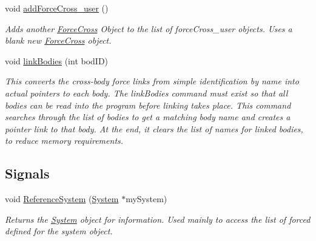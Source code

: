 \begin{DoxyCompactItemize}
void \hyperlink{classosea_1_1ofreq_1_1_system_abc3ad01f3fb22863565a8643202347f4}{add\-Force\-Cross\-\_\-user} ()
\begin{DoxyCompactList}\small\item\em Adds another \hyperlink{classosea_1_1ofreq_1_1_force_cross}{Force\-Cross} Object to the list of force\-Cross\-\_\-user objects. Uses a blank new \hyperlink{classosea_1_1ofreq_1_1_force_cross}{Force\-Cross} object. \end{DoxyCompactList}\item 
void \hyperlink{classosea_1_1ofreq_1_1_system_a280d384672341228d20181ea390118b9}{link\-Bodies} (int bod\-I\-D)
\begin{DoxyCompactList}\small\item\em This converts the cross-\/body force links from simple identification by name into actual pointers to each body. The link\-Bodies command must exist so that all bodies can be read into the program before linking takes place. This command searches through the list of bodies to get a matching body name and creates a pointer link to that body. At the end, it clears the list of names for linked bodies, to reduce memory requirements. \end{DoxyCompactList}\end{DoxyCompactItemize}
\subsection*{Signals}
\begin{DoxyCompactItemize}
\item 
void \hyperlink{classosea_1_1ofreq_1_1_system_a0889e1e19fe1c0c52fd385e759e5ecc7}{Reference\-System} (\hyperlink{classosea_1_1ofreq_1_1_system}{System} $\ast$my\-System)
\begin{DoxyCompactList}\small\item\em Returns the \hyperlink{classosea_1_1ofreq_1_1_system}{System} object for information. Used mainly to access the list of forced defined for the system object. \end{DoxyCompactList}\end{DoxyCompactItemize}
